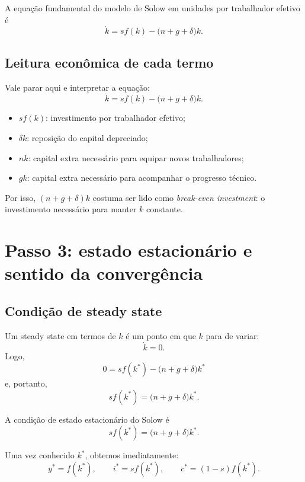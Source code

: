 \documentclass[11pt,a4paper]{article}
\begin{document}
\begin{resultado}
A equa\c{c}\~ao fundamental do modelo de Solow em unidades por trabalhador
efetivo \'e
\[
\dot{k}=s f(k)-\bigl(n+g+\delta\bigr)k.
\]
\end{resultado}

\subsection{Leitura econ\^omica de cada termo}

Vale parar aqui e interpretar a equa\c{c}\~ao:
\[
\dot{k}=sf(k)-\bigl(n+g+\delta\bigr)k.
\]

\begin{itemize}
  \item \(sf(k)\): investimento por trabalhador efetivo;
  \item \(\delta k\): reposi\c{c}\~ao do capital depreciado;
  \item \(nk\): capital extra necess\'ario para equipar novos trabalhadores;
  \item \(gk\): capital extra necess\'ario para acompanhar o progresso t\'ecnico.
\end{itemize}

Por isso, \((n+g+\delta)k\) costuma ser lido como \emph{break-even investment}:
o investimento necess\'ario para manter \(k\) constante.

\section{Passo 3: estado estacion\'ario e sentido da converg\^encia}

\subsection{Condi\c{c}\~ao de steady state}

Um steady state em termos de \(k\) \'e um ponto em que \(k\) para de variar:
\[
\dot{k}=0.
\]
Logo,
\[
0=s f(k^\ast)-\bigl(n+g+\delta\bigr)k^\ast
\]
e, portanto,
\[
s f(k^\ast)=\bigl(n+g+\delta\bigr)k^\ast.
\]

\begin{resultado}
A condi\c{c}\~ao de estado estacion\'ario do Solow \'e
\[
s f(k^\ast)=\bigl(n+g+\delta\bigr)k^\ast.
\]
\end{resultado}

Uma vez conhecido \(k^\ast\), obtemos imediatamente:
\[
y^\ast=f(k^\ast),
\qquad
i^\ast=sf(k^\ast),
\qquad
c^\ast=(1-s)f(k^\ast).
\]
\end{document}
